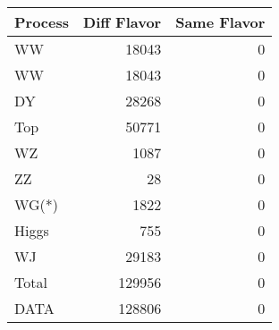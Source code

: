 \begin{table}[ht]
	\centering
\begin{tabular}{lrr}

Process &  Diff Flavor &  Same Flavor \\
		\hline
     WW &        18043 &            0 \\
     WW &        18043 &            0 \\
     DY &        28268 &            0 \\
    Top &        50771 &            0 \\
     WZ &         1087 &            0 \\
     ZZ &           28 &            0 \\
  WG(*) &         1822 &            0 \\
  Higgs &          755 &            0 \\
     WJ &        29183 &            0 \\
\hline
  Total &       129956 &            0 \\
   DATA &       128806 &            0 \\


\end{tabular}

\end{table}